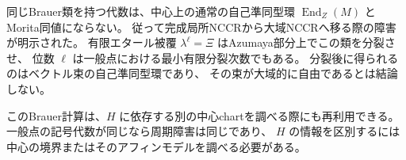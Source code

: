 同じBrauer類を持つ代数は、中心上の通常の自己準同型環
$\operatorname{End}_Z(M)$ とMorita同値にならない。
従って完成局所NCCRから大域NCCRへ移る際の障害が明示された。
有限エタール被覆 $\lambda^\ell=\Xi$ はAzumaya部分上でこの類を分裂させ、
位数 $\ell$ は一般点における最小有限分裂次数でもある。
分裂後に得られるのはベクトル束の自己準同型環であり、
その束が大域的に自由であるとは結論しない。

このBrauer計算は、$H$ に依存する別の中心chartを調べる際にも再利用できる。
一般点の記号代数が同じなら周期障害は同じであり、
$H$ の情報を区別するには中心の境界またはそのアフィンモデルを調べる必要がある。
